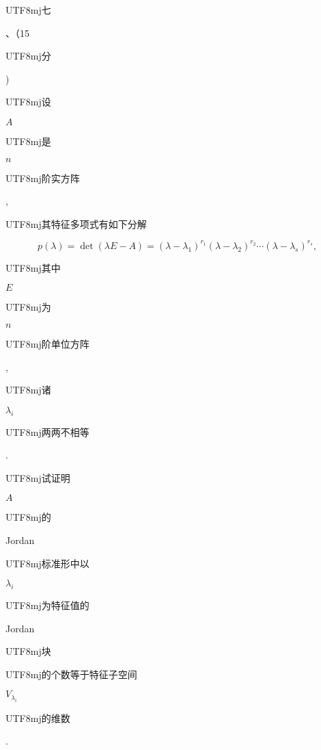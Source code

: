 \documentclass[10pt]{article}
\begin{document}
\begin{CJK}{UTF8}{mj}七\end{CJK}、（15 \begin{CJK}{UTF8}{mj}分\end{CJK}) \begin{CJK}{UTF8}{mj}设\end{CJK} $A$ \begin{CJK}{UTF8}{mj}是\end{CJK} $n$ \begin{CJK}{UTF8}{mj}阶实方阵\end{CJK}, \begin{CJK}{UTF8}{mj}其特征多项式有如下分解\end{CJK}
$$
p(\lambda)=\operatorname{det}(\lambda E-A)=\left(\lambda-\lambda_{1}\right)^{r_{1}}\left(\lambda-\lambda_{2}\right)^{r_{2}} \cdots\left(\lambda-\lambda_{s}\right)^{r_{s}},
$$
\begin{CJK}{UTF8}{mj}其中\end{CJK} $E$ \begin{CJK}{UTF8}{mj}为\end{CJK} $n$ \begin{CJK}{UTF8}{mj}阶单位方阵\end{CJK}, \begin{CJK}{UTF8}{mj}诸\end{CJK} $\lambda_{i}$ \begin{CJK}{UTF8}{mj}两两不相等\end{CJK}. \begin{CJK}{UTF8}{mj}试证明\end{CJK} $A$ \begin{CJK}{UTF8}{mj}的\end{CJK} Jordan \begin{CJK}{UTF8}{mj}标准形中以\end{CJK} $\lambda_{i}$ \begin{CJK}{UTF8}{mj}为特征值的\end{CJK} Jordan \begin{CJK}{UTF8}{mj}块\end{CJK} \begin{CJK}{UTF8}{mj}的个数等于特征子空间\end{CJK} $V_{\lambda_{i}}$ \begin{CJK}{UTF8}{mj}的维数\end{CJK}.
\end{document}
